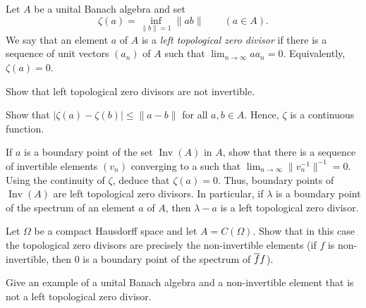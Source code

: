 \documentclass[12pt]{article}
\DeclareMathOperator{\Inv}{Inv}
\begin{document}
\begin{prb}
Let $A$ be a unital Banach algebra and set
\[\zeta(a)=\inf_{\|b\|=1}\|ab\|\qquad(a\in A).\]
We say that an element $a$ of $A$ is a \emph{left topological zero divisor} if there is a sequence of unit vectors $(a_n)$ of $A$ such that $\lim_{n\to\infty}aa_n=0$.
Equivalently, $\zeta(a)=0$.
\begin{parts}
\item
Show that left topological zero divisors are not invertible.
\item
Show that $|\zeta(a)-\zeta(b)|\le\|a-b\|$ for all $a,b\in A$.
Hence, $\zeta$ is a continuous function.
\item
If $a$ is a boundary point of the set $\Inv(A)$ in $A$, show that there is a sequence of invertible elements $(v_n)$ converging to a such that $\lim_{n\to\infty}\|v_n^{-1}\|^{-1}=0$.
Using the continuity of $\zeta$, deduce that $\zeta(a)=0$.
Thus, boundary points of $\Inv(A)$ are left topological zero divisors.
In particular, if $\lambda$ is a boundary point of the spectrum of an element $a$ of $A$, then $\lambda-a$ is a left topological zero divisor.
\item
Let $\Omega$ be a compact Hausdorff space and let $A=C(\Omega)$.
Show that in this case the topological zero divisors are precisely the non-invertible elements (if $f$ is non-invertible, then 0 is a boundary point of the spectrum of $\overline ff$).
\item
Give an example of a unital Banach algebra and a non-invertible element that is not a left topological zero divisor.
\end{parts}
\end{prb}
\end{document}
